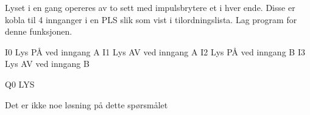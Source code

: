 

Lyset i en gang opereres av to sett med impulsbrytere et i hver ende. Disse er kobla til 4 innganger i en PLS slik som vist i tilordningslista.
Lag program for denne funksjonen.

I0	Lys PÅ ved inngang A
I1	Lys AV ved inngang A
I2	Lys PÅ ved inngang B
I3	Lys AV ved inngang B

Q0	LYS








Det er ikke noe l{\o}sning p{\aa} dette sp{\o}rsm{\aa}let













